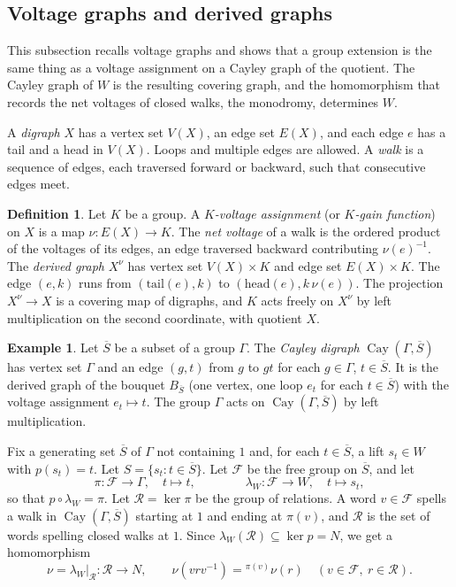 \documentclass[12pt,letterpaper]{article}
\numberwithin{equation}{section}
\theoremstyle{plain}
\theoremstyle{definition}
\newtheorem{definition}[theorem]{Definition}
\newtheorem{example}[theorem]{Example}
\newcommand{\act}[2]{{}^{#1}\!#2}          %
\newcommand{\fr}{\mathcal{F}}             %
\newcommand{\rel}{\mathcal{R}}            %
\DeclareMathOperator{\Cay}{Cay}
\begin{document}
\subsection{Voltage graphs and derived graphs}

This subsection recalls voltage graphs and shows that a group extension
is the same thing as a voltage assignment on a Cayley graph of the
quotient. The Cayley graph of $W$ is the resulting covering graph, and
the homomorphism that records the net voltages of closed walks, the
monodromy, determines $W$.

A \emph{digraph} $X$ has a vertex set $V(X)$, an edge set $E(X)$, and each
edge $e$ has a tail and a head in $V(X)$. Loops and multiple edges are
allowed. A \emph{walk} is a sequence of edges, each traversed forward or
backward, such that consecutive edges meet.

\begin{definition}\label{def:voltage}
Let $K$ be a group. A \emph{$K$-voltage assignment} (or \emph{$K$-gain
function}) on $X$ is a map $\nu:E(X)\to K$. The \emph{net voltage} of a
walk is the ordered product of the voltages of its edges, an edge
traversed backward contributing $\nu(e)^{-1}$. The \emph{derived graph}
$X^\nu$ has vertex set $V(X)\times K$ and edge set $E(X)\times K$. The edge
$(e,k)$ runs from $(\mathrm{tail}(e),k)$ to
$(\mathrm{head}(e),k\,\nu(e))$. The projection $X^\nu\to X$ is a covering
map of digraphs, and $K$ acts freely on $X^\nu$ by left multiplication on
the second coordinate, with quotient $X$.
\end{definition}

\begin{example}\label{ex:cayley}
Let $\overline{S}$ be a subset of a group $\Gamma$. The \emph{Cayley
digraph} $\Cay(\Gamma,\overline{S})$ has vertex set $\Gamma$ and an edge
$(g,t)$ from $g$ to $gt$ for each $g\in\Gamma$, $t\in\overline{S}$. It is
the derived graph of the bouquet $B_{\overline{S}}$ (one vertex, one loop
$e_t$ for each $t\in\overline{S}$) with the voltage assignment
$e_t\mapsto t$. The group $\Gamma$ acts on $\Cay(\Gamma,\overline{S})$ by
left multiplication.
\end{example}

Fix a generating set $\overline{S}$ of $\Gamma$ not containing $1$ and, for each
$t\in\overline{S}$, a lift $s_t\in W$ with $p(s_t)=t$. Let
$S=\{s_t:t\in\overline{S}\}$. Let $\fr$ be the free group on
$\overline{S}$, and let
\[
\pi:\fr\to\Gamma,\quad t\mapsto t,\qquad\qquad
\lambda_W:\fr\to W,\quad t\mapsto s_t,
\]
so that $p\circ\lambda_W=\pi$. Let $\rel=\ker\pi$ be the group of
relations. A word $v\in\fr$ spells a walk in $\Cay(\Gamma,\overline{S})$
starting at $1$ and ending at $\pi(v)$, and $\rel$ is the set of words
spelling closed walks at $1$. Since $\lambda_W(\rel)\subseteq\ker p=N$, we
get a homomorphism
\begin{equation}\label{eq:nu}
\nu=\lambda_W|_{\rel}:\rel\to N,\qquad
\nu(vrv^{-1})=\act{\pi(v)}{\nu(r)}\quad(v\in\fr,\ r\in\rel).
\end{equation}
\end{document}
